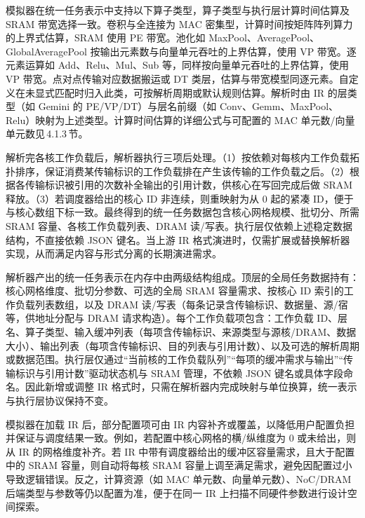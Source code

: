模拟器在统一任务表示中支持以下算子类型，算子类型与执行层计算时间估算及 SRAM 带宽选择一致。卷积与全连接为 MAC 密集型，计算时间按矩阵阵列算力的上界式估算，SRAM 使用 PE 带宽。池化如 MaxPool、AveragePool、GlobalAveragePool 按输出元素数与向量单元吞吐的上界估算，使用 VP 带宽。逐元素运算如 Add、Relu、Mul、Sub 等，同样按向量单元吞吐的上界估算，使用 VP 带宽。点对点传输对应数据搬运或 DT 类层，估算与带宽模型同逐元素。自定义在未显式匹配时归入此类，可按解析周期或默认规则估算。解析时由 IR 的层类型（如 Gemini 的 PE/VP/DT）与层名前缀（如 Conv、Gemm、MaxPool、Relu）映射为上述类型。计算时间估算的详细公式与可配置的 MAC 单元数/向量单元数见\,4.1.3\,节。


解析完各核工作负载后，解析器执行三项后处理。（1）按依赖对每核内工作负载拓扑排序，保证消费某传输标识的工作负载排在产生该传输的工作负载之后。（2）根据各传输标识被引用的次数补全输出的引用计数，供核心在写回完成后做 SRAM 释放。（3）若调度器给出的核心 ID 非连续，则重映射为从 0 起的紧凑 ID，便于与核心数组下标一致。最终得到的统一任务数据包含核心网格规模、批切分、所需 SRAM 容量、各核工作负载列表、DRAM 读/写表。执行层仅依赖上述稳定数据结构，不直接依赖 JSON 键名。当上游 IR 格式演进时，仅需扩展或替换解析器实现，从而满足内容与形式分离的长期演进需求。

解析器产出的统一任务表示在内存中由两级结构组成。顶层的全局任务数据持有：核心网格维度、批切分参数、可选的全局 SRAM 容量需求、按核心 ID 索引的工作负载列表数组，以及 DRAM 读/写表（每条记录含传输标识、数据量、源/宿等，供地址分配与 DRAM 请求构造）。每个工作负载项包含：工作负载 ID、层名、算子类型、输入缓冲列表（每项含传输标识、来源类型与源核/DRAM、数据大小）、输出列表（每项含传输标识、目的列表与引用计数）、以及可选的解析周期或数据范围。执行层仅通过“当前核的工作负载队列”“每项的缓冲需求与输出”“传输标识与引用计数”驱动状态机与 SRAM 管理，不依赖 JSON 键名或具体字段命名。因此新增或调整 IR 格式时，只需在解析器内完成映射与单位换算，统一表示与执行层协议保持不变。


模拟器在加载 IR 后，部分配置项可由 IR 内容补齐或覆盖，以降低用户配置负担并保证与调度结果一致。例如，若配置中核心网格的横/纵维度为 0 或未给出，则从 IR 的网格维度补齐。若 IR 中带有调度器给出的缓冲区容量需求，且大于配置中的 SRAM 容量，则自动将每核 SRAM 容量上调至满足需求，避免因配置过小导致逻辑错误。反之，计算资源（如 MAC 单元数、向量单元数）、NoC/DRAM 后端类型与参数等仍以配置为准，便于在同一 IR 上扫描不同硬件参数进行设计空间探索。

